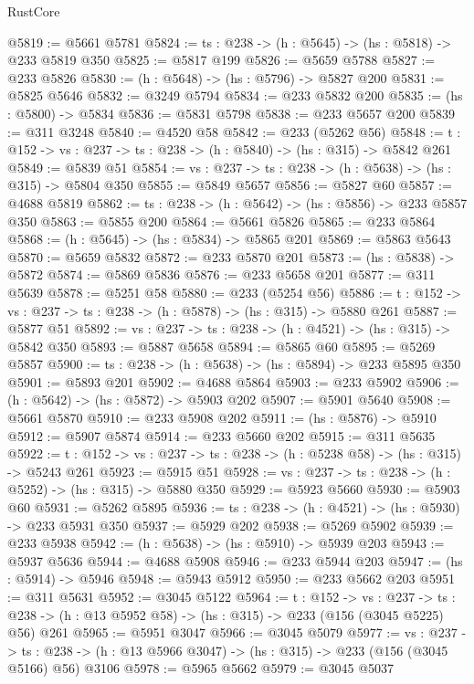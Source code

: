 \begin{lexlean}{RustCore}
\begin{coremodule}
@5819 := @5661 @5781
@5824 := {ts : @238} -> (h : @5645) -> (hs : @5818) -> @233 @5819 @350
@5825 := @5817 @199
@5826 := @5659 @5788
@5827 := @233 @5826
@5830 := (h : @5648) -> (hs : @5796) -> @5827 @200
@5831 := @5825 @5646
@5832 := @3249 @5794
@5834 := @233 @5832 @200
@5835 := (hs : @5800) -> @5834
@5836 := @5831 @5798
@5838 := @233 @5657 @200
@5839 := @311 @3248
@5840 := @4520 @58
@5842 := @233 (@5262 @56)
@5848 := {t : @152} -> {vs : @237} -> {ts : @238} -> (h : @5840) -> (hs : @315) -> @5842 @261
@5849 := @5839 @51
@5854 := {vs : @237} -> {ts : @238} -> (h : @5638) -> (hs : @315) -> @5804 @350
@5855 := @5849 @5657
@5856 := @5827 @60
@5857 := @4688 @5819
@5862 := {ts : @238} -> (h : @5642) -> (hs : @5856) -> @233 @5857 @350
@5863 := @5855 @200
@5864 := @5661 @5826
@5865 := @233 @5864
@5868 := (h : @5645) -> (hs : @5834) -> @5865 @201
@5869 := @5863 @5643
@5870 := @5659 @5832
@5872 := @233 @5870 @201
@5873 := (hs : @5838) -> @5872
@5874 := @5869 @5836
@5876 := @233 @5658 @201
@5877 := @311 @5639
@5878 := @5251 @58
@5880 := @233 (@5254 @56)
@5886 := {t : @152} -> {vs : @237} -> {ts : @238} -> (h : @5878) -> (hs : @315) -> @5880 @261
@5887 := @5877 @51
@5892 := {vs : @237} -> {ts : @238} -> (h : @4521) -> (hs : @315) -> @5842 @350
@5893 := @5887 @5658
@5894 := @5865 @60
@5895 := @5269 @5857
@5900 := {ts : @238} -> (h : @5638) -> (hs : @5894) -> @233 @5895 @350
@5901 := @5893 @201
@5902 := @4688 @5864
@5903 := @233 @5902
@5906 := (h : @5642) -> (hs : @5872) -> @5903 @202
@5907 := @5901 @5640
@5908 := @5661 @5870
@5910 := @233 @5908 @202
@5911 := (hs : @5876) -> @5910
@5912 := @5907 @5874
@5914 := @233 @5660 @202
@5915 := @311 @5635
@5922 := {t : @152} -> {vs : @237} -> {ts : @238} -> (h : @5238 @58) -> (hs : @315) -> @5243 @261
@5923 := @5915 @51
@5928 := {vs : @237} -> {ts : @238} -> (h : @5252) -> (hs : @315) -> @5880 @350
@5929 := @5923 @5660
@5930 := @5903 @60
@5931 := @5262 @5895
@5936 := {ts : @238} -> (h : @4521) -> (hs : @5930) -> @233 @5931 @350
@5937 := @5929 @202
@5938 := @5269 @5902
@5939 := @233 @5938
@5942 := (h : @5638) -> (hs : @5910) -> @5939 @203
@5943 := @5937 @5636
@5944 := @4688 @5908
@5946 := @233 @5944 @203
@5947 := (hs : @5914) -> @5946
@5948 := @5943 @5912
@5950 := @233 @5662 @203
@5951 := @311 @5631
@5952 := @3045 @5122
@5964 := {t : @152} ->
  {vs : @237} ->
  {ts : @238} -> (h : @13 @5952 @58) -> (hs : @315) -> @233 (@156 (@3045 @5225) @56) @261
@5965 := @5951 @3047
@5966 := @3045 @5079
@5977 := {vs : @237} ->
  {ts : @238} -> (h : @13 @5966 @3047) -> (hs : @315) -> @233 (@156 (@3045 @5166) @56) @3106
@5978 := @5965 @5662
@5979 := @3045 @5037

\end{coremodule}
\end{lexlean}
